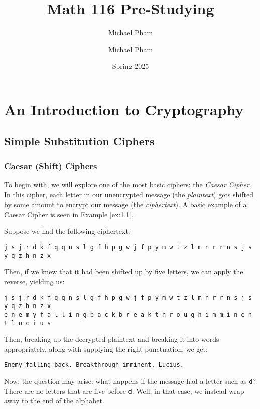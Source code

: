 \documentclass[openany]{book}
\title{#1}
\author{Michael Pham}
\date{#2}
\renewcommand{\mytitle}[2]{%
	\title{#1}
	\author{Michael Pham}
	\date{#2}
	\maketitle
	\newpage
	\mytoc
	\newpage
}
\begin{document}
\mytitle{Math 116 Pre-Studying}{Spring 2025}

\chapter{An Introduction to Cryptography}
\section{Simple Substitution Ciphers}
\subsection{Caesar (Shift) Ciphers}
To begin with, we will explore one of the most basic ciphers: the \textit{Caesar Cipher}. In this cipher, each letter in our unencrypted message (the \textit{plaintext}) gets shifted by some amount to encrypt our message (the \textit{ciphertext}). A basic example of a Caesar Cipher is seen in Example \ref{ex:1.1}.

\begin{example}
	Suppose we had the following ciphertext:
	\begin{center}
		\texttt{j s j r d k f q q n s l g f h p g w j f p y m w t z l m n r r n s j s y q z h n z x}
	\end{center}
	
	Then, if we knew that it had been shifted up by five letters, we can apply the reverse, yielding us:
	\begin{center}
		\texttt{j s j r d k f q q n s l g f h p g w j f p y m w t z l m n r r n s j s y q z h n z x}
		\underline{\hspace{\textwidth}} \\
		\texttt{e n e m y f a l l i n g b a c k b r e a k t h r o u g h i m m i n e n t l u c i u s}
	\end{center}
	
	Then, breaking up the decrypted plaintext and breaking it into words appropriately, along with supplying the right punctuation, we get:
	\begin{center}
		\texttt{Enemy falling back. Breakthrough imminent. Lucius.}
	\end{center}
\end{example}


Now, the question may arise: what happens if the message had a letter such as \texttt{d}? There are no letters that are five before \texttt{d}. Well, in that case, we instead wrap away to the end of the alphabet.
\end{document}
